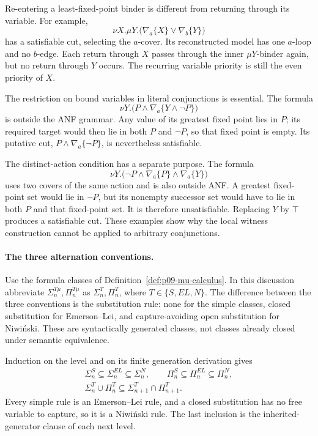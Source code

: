 Re-entering a least-fixed-point
binder is different from
returning through its variable.
For example,
\[
 \nu X.\mu Y.
       \bigl(\nabla_a\{X\}\lor\nabla_b\{Y\}\bigr)
\]
has a satisfiable cut, selecting
the \(a\)-cover.
Its reconstructed model has
one \(a\)-loop and no
\(b\)-edge. Each return
through \(X\) passes through
the inner \(\mu Y\)-binder
again, but no return through
\(Y\) occurs. The recurring
variable priority is still
the even priority of \(X\).

The restriction on bound
variables in literal
conjunctions is essential.
The formula
\[
 \nu Y.\bigl(P\land
                  \nabla_a\{Y\land\neg P\}\bigr)
\]
is outside the ANF grammar.
Any value of its greatest
fixed point lies in \(P\);
its required target would
then lie in both \(P\)
and \(\neg P\), so that
fixed point is empty.
Its putative cut,
\(P\land\nabla_a\{\neg P\}\),
is nevertheless satisfiable.

The distinct-action condition
has a separate purpose.
The formula
\[
 \nu Y.\bigl(\neg P\land
              \nabla_a\{P\}\land\nabla_a\{Y\}\bigr)
\]
uses two covers of the
same action and is also
outside ANF. A greatest
fixed-point set would
lie in \(\neg P\), but
its nonempty successor
set would have to lie
in both \(P\) and that
fixed-point set. It
is therefore unsatisfiable.
Replacing \(Y\) by \(\top\)
produces a satisfiable cut.
These examples show why
the local witness construction
cannot be applied to
arbitrary conjunctions.

\paragraph{The three alternation conventions.}
\label{sec:p09-mu-alternation-classes}
Use the formula classes of
Definition~\ref{def:p09-mu-calculus}.
In this discussion abbreviate
\(\Sigma_n^{T\mu},\Pi_n^{T\mu}\)
as \(\Sigma_n^T,\Pi_n^T\),
where \(T\in\{S,EL,N\}\).
The difference between the
three conventions is the
substitution rule: none for
the simple classes, closed
substitution for Emerson--Lei,
and capture-avoiding open
substitution for Niwi\'nski.
These are syntactically
generated classes, not
classes already closed
under semantic equivalence.

Induction on the level and
on its finite generation
derivation gives
\[
\begin{gathered}
 \Sigma_n^S\subseteq\Sigma_n^{EL}\subseteq\Sigma_n^N,
 \qquad
 \Pi_n^S\subseteq\Pi_n^{EL}\subseteq\Pi_n^N,\\
 \Sigma_n^T\cup\Pi_n^T
      \subseteq\Sigma_{n+1}^T\cap\Pi_{n+1}^T.
\end{gathered}
\]
Every simple rule is an
Emerson--Lei rule, and a
closed substitution has
no free variable to capture,
so it is a Niwi\'nski rule.
The last inclusion is
the inherited-generator
clause of each next level.

